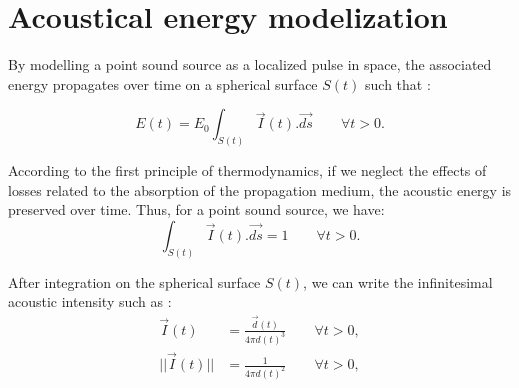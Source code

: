 \documentclass[AMA,STIX1COL]{WileyNJD-v2}
\begin{document}
\section{Acoustical energy modelization}\label{sec2}


By modelling a point sound source as a localized pulse in space, the associated energy propagates \cite{jouhaneau} over time on a spherical surface $S(t)$ such that :

\begin{equation} 
E(t) = E_0 \int_{S(t)} \overrightarrow{I}(t).\overrightarrow{ds} \qquad \forall t > 0.
\end{equation}

According to the first principle of thermodynamics, if we neglect the effects of losses related to the absorption of the propagation medium, the acoustic energy is preserved over time. Thus, for a point sound source, we have:
\begin{equation} 
\int_{S(t)} \overrightarrow{I}(t).\overrightarrow{ds} = 1 \qquad \forall t > 0.
\end{equation}

After integration on the spherical surface $S(t)$, we can write the infinitesimal acoustic intensity such as :
\begin{align} 
 \overrightarrow{I}(t) &= \frac{ \overrightarrow{d}(t)}{4\pi d(t)^3} \qquad \forall t > 0 \nonumber, \\
|| \overrightarrow{I}(t) || &= \frac{1}{4\pi d(t)^2} \qquad \forall t > 0,
\end{align}
\end{document}
